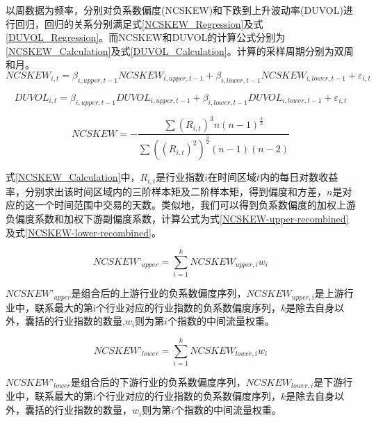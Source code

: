 \documentclass{sysuthesis}
\begin{document}
以周数据为频率，分别对负系数偏度(NCSKEW)和下跌到上升波动率(DUVOL)进行回归，回归的关系分别满足式\ref{NCSKEW_Regression}及式\ref{DUVOL_Regression}。而NCSKEW和DUVOL的计算公式分别为\ref{NCSKEW_Calculation}及式\ref{DUVOL_Calculation}。计算的采样周期分别为双周和月。
\begin{equation}
\label{NCSKEW_Regression}
{NCSKEW_{i,t}} = {\beta _{i,upper,t - 1}}{NCSKEW_{i,upper,t - 1}} + {\beta _{i,lower,t - 1}}{NCSKEW_{i,lower,t - 1}} + {\varepsilon _{i,t}}
\end{equation}

\begin{equation}
\label{DUVOL_Regression}
{DUVOL_{i,t}} = {\beta _{i,upper,t - 1}}{DUVOL_{i,upper,t - 1}} + {\beta _{i,lower,t - 1}}{DUVOL_{i,lower,t - 1}} + {\varepsilon _{i,t}}
\end{equation}

\begin{equation}
\label{NCSKEW_Calculation}
NCSKEW =  - \frac{{\sum {{{({R_{i,t}})}^3}} n{{(n - 1)}^{\frac{3}{2}}}}}{{\sum {{{({{({R_{i,t}})}^2})}^{\frac{3}{2}}}} (n - 1)(n - 2)}}
\end{equation}

式\ref{NCSKEW_Calculation}中，$R_{i,t}$是行业指数$i$在时间区域$t$内的每日对数收益率，分别求出该时间区域内的三阶样本矩及二阶样本矩，得到偏度和方差，$n$是对应的这一个时间范围中交易的天数。类似地，我们可以得到负系数偏度的加权上游负偏度系数和加权下游副偏度系数，计算公式为式\ref{NCSKEW-upper-recombined}及式\ref{NCSKEW-lower-recombined}。

\begin{equation}
\label{NCSKEW-upper-recombined} 
{NCSKEW’_{upper}} = \sum\limits_{i = 1}^k {{NCSKEW_{upper,i}}{w_i}} 
\end{equation}

${NCSKEW’_{upper}}$是组合后的上游行业的负系数偏度序列，${NCSKEW_{upper,i}}$是上游行业中，联系最大的第i个行业对应的行业指数的负系数偏度序列，$k$是除去自身以外，囊括的行业指数的数量,${w_i}$则为第$i$个指数的中间流量权重。

\begin{equation}
\label{NCSKEW-lower-recombined} 
{NCSKEW’_{lower}} = \sum\limits_{i = 1}^k {{NCSKEW_{lower,i}}{w_i}} 
\end{equation}

${NCSKEW’_{lower}}$是组合后的下游行业的负系数偏度序列，${NCSKEW_{lower,i}}$是下游行业中，联系最大的第i个行业对应的行业指数的负系数偏度序列，$k$是除去自身以外，囊括的行业指数的数量，${w_i}$则为第$i$个指数的中间流量权重。
\end{document}
